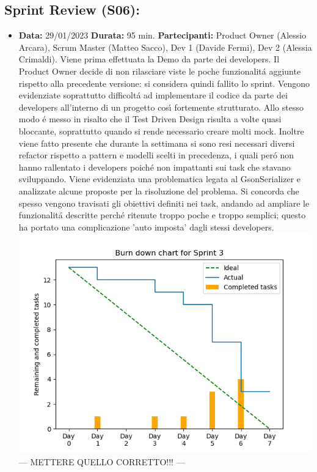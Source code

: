 \documentclass[a4paper, oneside]{article}
\newcommand\tre{Scrum Master (Matteo Sacco), Dev 1 (Davide Fermi), Dev 2 (Alessia Crimaldi).}
\newcommand\treP{Product Owner (Alessio Arcara), }
\begin{document}
\begin{landscape}
        \subsection{Sprint Review (S06):}
        \begin{itemize}
            \item \textbf{Data:} 29/01/2023
            \newline \textbf{Durata:} 95 min.
            \newline \textbf{Partecipanti:} \treP \tre
            \newline
            \newline Viene prima effettuata la Demo da parte dei developers. Il Product Owner decide di non rilasciare viste le poche funzionalit\'a aggiunte rispetto alla precedente versione: si considera quindi fallito lo sprint.
            \newline Vengono evidenziate soprattutto  difficolt\'a ad implementare il codice da parte dei developers all'interno di un progetto cos\'{\i} fortemente strutturato. Allo stesso modo \'e messo in risalto che il Test Driven Design risulta a volte quasi bloccante, soprattutto quando si rende necessario creare molti mock. Inoltre viene fatto presente che durante la settimana si sono resi necessari diversi refactor rispetto a pattern e modelli scelti in precedenza, i quali per\'o non hanno rallentato i developers poich\'e non impattanti sui task che stavano sviluppando. Viene evidenziata una problematica legata al GsonSerializer e analizzate alcune proposte per la risoluzione del problema.
            \newline Si concorda che spesso vengono travisati gli obiettivi definiti nei task, andando ad ampliare le funzionalit\'a descritte perch\'e ritenute troppo poche e troppo semplici; questo ha portato una complicazione 'auto imposta' dagli stessi developers. \\

            \includegraphics[scale=0.75]{Sprint03_BurnDownChart}  --- METTERE QUELLO CORRETTO!!! ---


\end{itemize}
\end{landscape}
\end{document}
